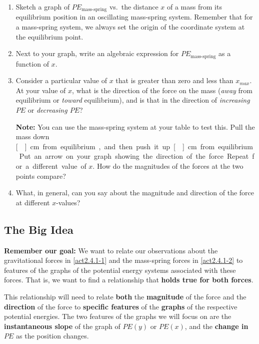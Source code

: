 \begin{enumerate}
	\item Sketch a graph of $PE_\text{mass-spring}$ vs.\ the distance $x$ of a mass from its equilibrium position in an oscillating mass-spring system. Remember that for a mass-spring system, we always set the origin of the coordinate system at the equilibrium point.
	
	\item Next to your graph, write an algebraic expression for $PE_\text{mass-spring}$ as a function of $x$.
	
	\item Consider a particular value of $x$ that is greater than zero and less than $x_{max}$. At your value of $x$, what is the direction of the force on the mass (\emph{away} from equilibrium or \emph{toward} equilibrium), and is that in the direction of \emph{increasing $PE$} or \emph{decreasing $PE$}?
	
		\textbf{Note:} You can use the mass-spring system at your table to test this. Pull the mass down \unit[]{cm} from equilibrium, and then push it up \unit[]{cm} from equilibrium.
		
		Put an arrow on your graph showing the direction of the force. Repeat for a different value of $x$. How do the magnitudes of the forces at the two points compare?
	
	\item What, in general, can you say about the magnitude and direction of the force at different $x$-values?
\end{enumerate}

\subsection{The Big Idea}

\begin{overview}

\textbf{Remember our goal:} We want to relate our observations about the gravitational forces in \ref{act2.4.1-1} and the mass-spring forces in \ref{act2.4.1-2} to features of the graphs of the potential energy systems associated with these forces. That is, we want to find a relationship that \textbf{holds true for both forces}.
	
\end{overview}

\noindent This relationship will need to relate \textbf{both} the \textbf{magnitude} of the force and the \textbf{direction} of the force to \textbf{specific features} of the \textbf{graphs} of the respective potential energies. The two features of the graphs we will focus on are the \textbf{instantaneous slope} of the graph of $PE(y)$ or $PE(x)$, and the \textbf{change in $PE$} as the position changes.

